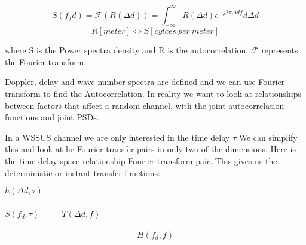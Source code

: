 \begin{equation}
S(f_fd) = \mathcal{F}(R(\Delta d )) = \int_{- \infty}^{\infty} R(\Delta d)e^{-j2 \pi \Delta d f} d \Delta d
\end{equation}
\begin{equation}
R [meter] \Leftrightarrow
S [cylces \ per \ meter]
\end{equation}

where S is the Power spectra density and R is the autocorrelation. $\mathcal{F}$ represents the Fourier transform. 

Doppler, delay and wave number spectra are defined and we can use Fourier transform to find the Autocorrelation. In reality we want to look at relationships between factors that affect a random channel, with the joint autocorrelation functions and joint PSDs\citep{SpaceWirelessChan}.




In a \gls{WSSUS} channel we are only interested in the time delay $\tau$ We can simplify this and look at he Fourier transfer pairs in only two of the dimensions. Here is the time delay space relationship Fourier transform pair. This gives us the deterministic or instant transfer functions:

\begin{center}
$h(\Delta d,\tau)$\\
\\
$S(f_d,\tau)$ $\quad \quad$ $T(\Delta d,f)$\\
\\
\vspace{-1.9em}
\begin{equation}
H(f_d,f)
\end{equation}
\end{center}


